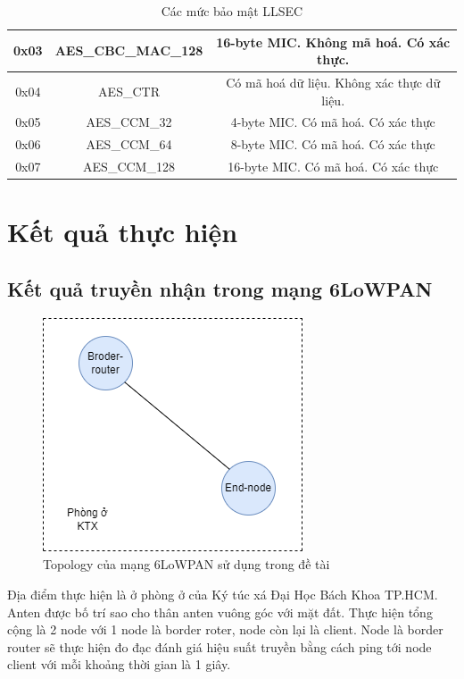 \documentclass{report}
\begin{document}
\begin{enumerate}
\begin{table}[h]
\begin{tabular}{|c|c|c|}
			0x03             & AES\_CBC\_MAC\_128      & 16-byte MIC. Không mã hoá. Có xác thực.      \\ \hline
			0x04             & AES\_CTR              & Có mã hoá dữ liệu. Không xác thực dữ liệu.   \\ \hline
			0x05             & AES\_CCM\_32           & 4-byte MIC. Có mã hoá. Có xác thực           \\ \hline
			0x06             & AES\_CCM\_64           & 8-byte MIC. Có mã hoá. Có xác thực           \\ \hline
			0x07             & AES\_CCM\_128          & 16-byte MIC. Có mã hoá. Có xác thực          \\ \hline
		\end{tabular}
		\caption{Các mức bảo mật LLSEC}
	\end{table}
\end{enumerate}

\newpage
\chapter{Kết quả thực hiện}
\section{Kết quả truyền nhận trong mạng 6LoWPAN}
\begin{figure}[h]
	\centering
	\includegraphics[scale = 0.5]{fig65.png}
	\caption{Topology của mạng 6LoWPAN sử dụng trong đề tài}
	\label{fig:Graph65}
\end{figure}
Địa điểm thực hiện là ở phòng ở của Ký túc xá Đại Học Bách Khoa TP.HCM. Anten
được bố trí sao cho thân anten vuông góc với mặt đất. Thực hiện tổng cộng là 2 node
với 1 node là border roter, node còn lại là client. Node là border router sẽ thực hiện đo đạc đánh giá hiệu suất truyền bằng cách ping tới node client với mỗi khoảng thời gian là 1 giây. \\
\end{document}
